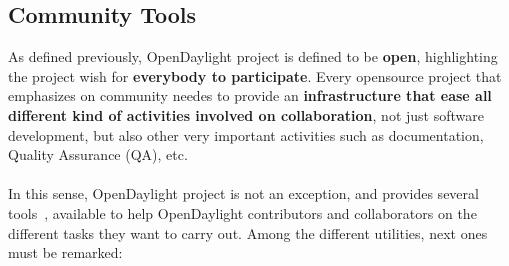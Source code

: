 \documentclass[a4paper, 12pt]{book}
\begin{document}
\subsection{Community Tools}
As defined previously, OpenDaylight project is defined to be \textbf{open}, highlighting the project wish for \textbf{everybody to participate}. Every opensource project that emphasizes on community needes to provide an \textbf{infrastructure that ease all different kind of activities involved on collaboration}, not just software development, but also other very important activities such as documentation, Quality Assurance (QA), etc.\\
\\
In this sense, OpenDaylight project is not an exception, and provides several tools~\cite{OpenDaylightTools}, available to help OpenDaylight contributors and collaborators on the different tasks they want to carry out. Among the different utilities, next ones must be remarked:
\end{document}
